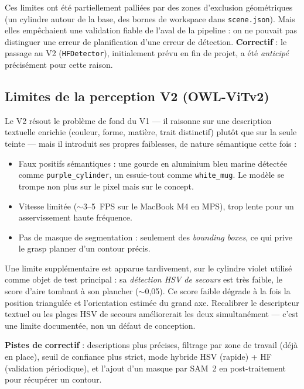 Ces limites ont été partiellement palliées par des zones d'exclusion géométriques
(un cylindre autour de la base, des bornes de workspace dans \texttt{scene.json}).
Mais elles empêchaient une validation fiable de l'aval de la pipeline : on ne
pouvait pas distinguer une erreur de planification d'une erreur de détection.
\textbf{Correctif} : le passage au V2 (\texttt{HFDetector}), initialement prévu en
fin de projet, a été \emph{anticipé} précisément pour cette raison.

\subsection{Limites de la perception V2 (OWL-ViTv2)}

Le V2 résout le problème de fond du V1 --- il raisonne sur une description
textuelle enrichie (couleur, forme, matière, trait distinctif) plutôt que sur la
seule teinte --- mais il introduit ses propres faiblesses, de nature sémantique
cette fois :
\begin{itemize}
  \item Faux positifs sémantiques : une gourde en aluminium bleu marine détectée
        comme \texttt{purple\_cylinder}, un essuie-tout comme \texttt{white\_mug}.
        Le modèle se trompe non plus sur le pixel mais sur le concept.
  \item Vitesse limitée ($\sim$3--5~FPS sur le MacBook M4 en MPS), trop lente pour
        un asservissement haute fréquence.
  \item Pas de masque de segmentation : seulement des \emph{bounding boxes}, ce qui
        prive le grasp planner d'un contour précis.
\end{itemize}

Une limite supplémentaire est apparue tardivement, sur le cylindre violet utilisé
comme objet de test principal : sa \emph{détection HSV de secours} est très
faible, le score d'aire tombant à son plancher ($\sim$0{,}05). Ce score faible
dégrade à la fois la position triangulée et l'orientation estimée du grand axe. Recalibrer le
descripteur textuel ou les plages HSV de secours améliorerait les deux
simultanément --- c'est une limite documentée, non un défaut de conception.

\textbf{Pistes de correctif} : descriptions plus précises, filtrage par zone de
travail (déjà en place), seuil de confiance plus strict, mode hybride HSV (rapide)
+ HF (validation périodique), et l'ajout d'un masque par SAM~2 en post-traitement
pour récupérer un contour.

